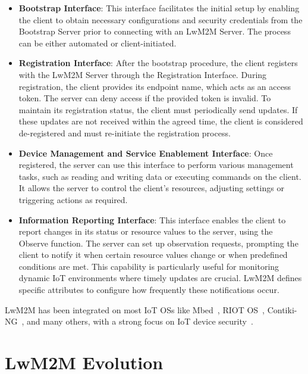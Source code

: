 \documentclass[11pt,sigconf]{iabart}
\begin{document}
\begin{itemize}
  \item \textbf{Bootstrap Interface}: This interface facilitates the initial setup by enabling the client to obtain necessary configurations and security credentials from the Bootstrap Server prior to connecting with an LwM2M Server. The process can be either automated or client-initiated.
  
  \item \textbf{Registration Interface}: After the bootstrap procedure, the client registers with the LwM2M Server through the Registration Interface. During registration, the client provides its endpoint name, which acts as an access token. The server can deny access if the provided token is invalid. To maintain its registration status, the client must periodically send updates. If these updates are not received within the agreed time, the client is considered de-registered and must re-initiate the registration process.
  
  \item \textbf{Device Management and Service Enablement Interface}: Once registered, the server can use this interface to perform various management tasks, such as reading and writing data or executing commands on the client. It allows the server to control the client's resources, adjusting settings or triggering actions as required.
  
  \item \textbf{Information Reporting Interface}: This interface enables the client to report changes in its status or resource values to the server, using the Observe function. The server can set up observation requests, prompting the client to notify it when certain resource values change or when predefined conditions are met. This capability is particularly useful for monitoring dynamic IoT environments where timely updates are crucial. LwM2M defines specific attributes to configure how frequently these notifications occur.
\end{itemize}

LwM2M has been integrated on most IoT OSs like Mbed~\cite{mbed}, RIOT OS~\cite{riot_os}, Contiki-NG~\cite{contiki_ng}, and many others, with a strong focus on IoT device security~\cite{pop00010}.

\section{LwM2M Evolution} \label{extensions}
\end{document}
